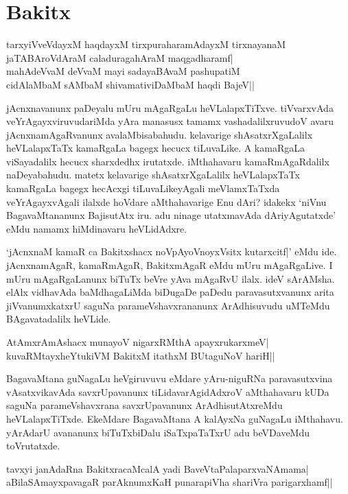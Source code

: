 \chapter{Bakitx}\label{chap2}

\begin{shloka}
tarxyiVveVdayxM haqdayxM tirxpuraharamAdayxM tirxnayanaM\\
jaTABAroVdAraM caladuragahAraM maqgadharamf|\\
mahAdeVvaM deVvaM mayi sadayaBAvaM pashupatiM\\
cidAlaMbaM sAMbaM shivamativiDaMbaM haqdi BajeV||
\end{shloka}

jAcnxnavanunx paDeyalu mUru mAgaRgaLu heVLalapxTiTxve. tiVvarxvAda veYrAgayxviruvudariMda yAra manasusx tamamx vashadalilxruvudoV 
avaru jAcnxnamAgaRvanunx avalaMbisabahudu. kelavarige shAsatxrXgaLalilx heVLalapxTaTx kamaRgaLa bagegx hecucx tiLuvaLike. A kamaRgaLa 
viSayadalilx hecucx sharxdedhx irutatxde. iMthahavaru kamaRmAgaRdalilx naDeyabahudu. matetx kelavarige shAsatxrXgaLalilx heVLalapxTaTx kamaRgaLa bagegx hecAcxgi 
tiLuvaLikeyAgali meVlamxTaTxda veYrAgayxvAgali ilalxde hoVdare aMthahavarige Enu dAri? idakekx `niVnu BagavaMtananunx BajisutAtx iru. adu ninage 
utatxmavAda dAriyAgutatxde' eMdu namamx hiMdinavaru heVLidAdxre.

`jAcnxnaM kamaR ca Bakitxshacx noVpAyoVnoyxV\s sitx kutarxcitf|' eMdu ide. jAcnxnamAgaR, kamaRmAgaR, BakitxmAgaR eMdu mUru 
mAgaRgaLive. I mUru mAgaRgaLanunx biTuTx beVre yAva mAgaRvU ilalx. ideV sArAMsha. elAlx vidhavAda baMdhagaLiMda biDugaDe paDedu 
paravasutxvanunx arita jiVvanumxkatxrU saguNa parameVshavxrananunx ArAdhisuvudu uMTeMdu BAgavatadalilx heVLide.

\begin{shloka}
AtAmxrAmAshacx munayoV nigarxRMthA apayxrukarxmeV|\\
kuvaRMtayxheYtukiVM BakitxM itathxM BUtaguNoV hariH||
\end{shloka}

BagavaMtana guNagaLu heVgiruvuvu eMdare yAru-niguRNa paravasutxvina vAsatxvikavAda savxrUpavanunx tiLidavarAgidAdxroV aMthahavaru 
kUDa saguNa parameVshavxrana savxrUpavanunx ArAdhisutAtxreMdu heVLalapxTiTxde. EkeMdare BagavaMtana A kalAyxNa guNagaLu 
iMthahavu. yArAdarU avananunx biTuTxbiDalu iSaTxpaTaTxrU adu beVDaveMdu toVrutatxde.

\begin{shloka}
tavxyi janAdaRna BakitxracaMcalA yadi BaveVtaPalaparxvaNAmama|\\
aBilaSAmayxpavagaR parAknumxKaH punarapiVha shariVra parigarxhamf||
\end{shloka}

